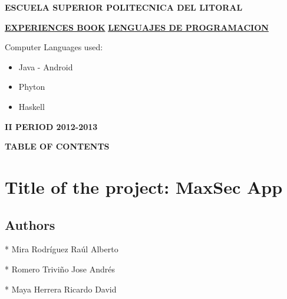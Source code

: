 \documentclass[12pt,letterpaper]{article}
\begin{document}
\begin{center}
{\huge }\textbf{{\huge  \newline \newline ESCUELA SUPERIOR \newline \newline POLITECNICA DEL LITORAL}}
\newline \newline \newline

{\LARGE \underline{\textbf{EXPERIENCES BOOK}}}
\newline \newline
\underline{\textbf{LENGUAJES DE PROGRAMACION}{\LARGE }}
\newline \newline{\huge }

\end{center}

\begin{flushleft}
{\Large Computer Languages used:} \newline
\begin{itemize}
\item {\Large Java - Android} \newline
\item {\Large Phyton} \newline
\item {\Large Haskell } \newline
\end{itemize}
\end{flushleft}
{\huge }

\textbf{{\LARGE II PERIOD 2012-2013}}
{\huge }\newpage

\begin{center}
\textbf{{\LARGE TABLE OF CONTENTS}}
\end{center} 
\tableofcontents

\newpage

\section{Title of the project: MaxSec App}
\subsection{Authors}

* Mira Rodríguez Raúl Alberto

* Romero Triviño Jose Andrés

* Maya Herrera Ricardo David
\end{document}
